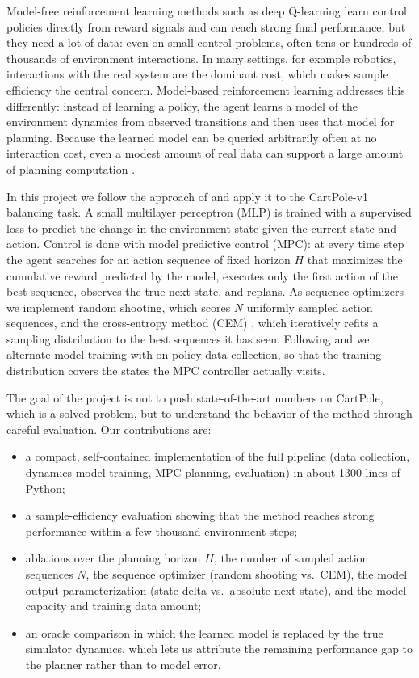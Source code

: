 \documentclass{article}
\begin{document}
Model-free reinforcement learning methods such as deep Q-learning \citep{mnih2015} learn control policies directly from reward signals and can reach strong final performance, but they need a lot of data: even on small control problems, often tens or hundreds of thousands of environment interactions. In many settings, for example robotics, interactions with the real system are the dominant cost, which makes sample efficiency the central concern. Model-based reinforcement learning addresses this differently: instead of learning a policy, the agent learns a model of the environment dynamics from observed transitions and then uses that model for planning. Because the learned model can be queried arbitrarily often at no interaction cost, even a modest amount of real data can support a large amount of planning computation \citep{sutton2018, deisenroth2011}.

In this project we follow the approach of \citet{nagabandi2018} and apply it to the CartPole-v1 balancing task. A small multilayer perceptron (MLP) is trained with a supervised loss to predict the change in the environment state given the current state and action. Control is done with model predictive control (MPC): at every time step the agent searches for an action sequence of fixed horizon $H$ that maximizes the cumulative reward predicted by the model, executes only the first action of the best sequence, observes the true next state, and replans. As sequence optimizers we implement random shooting, which scores $N$ uniformly sampled action sequences, and the cross-entropy method (CEM) \citep{rubinstein1999}, which iteratively refits a sampling distribution to the best sequences it has seen. Following \citet{nagabandi2018} and \citet{ross2011} we alternate model training with on-policy data collection, so that the training distribution covers the states the MPC controller actually visits.

The goal of the project is not to push state-of-the-art numbers on CartPole, which is a solved problem, but to understand the behavior of the method through careful evaluation. Our contributions are:
\begin{itemize}
  \item a compact, self-contained implementation of the full pipeline (data collection, dynamics model training, MPC planning, evaluation) in about 1300 lines of Python;
  \item a sample-efficiency evaluation showing that the method reaches strong performance within a few thousand environment steps;
  \item ablations over the planning horizon $H$, the number of sampled action sequences $N$, the sequence optimizer (random shooting vs.\ CEM), the model output parameterization (state delta vs.\ absolute next state), and the model capacity and training data amount;
  \item an oracle comparison in which the learned model is replaced by the true simulator dynamics, which lets us attribute the remaining performance gap to the planner rather than to model error.
\end{itemize}
\end{document}
